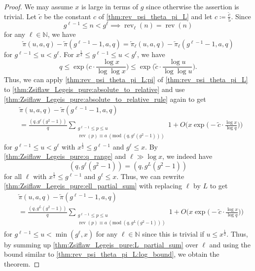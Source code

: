 \documentclass[hidelinks]{amsart}
\numberwithin{equation}{section}
\theoremstyle{plain}
\theoremstyle{definition}
\renewcommand{\mod}[1]{(\mathrm{mod}\ #1)}
\DeclareMathOperator{\rev}{rev}
\begin{document}
\begin{proof}
We may assume $x$ is large in terms of $g$ since otherwise the assertion is trivial.
Let $\widetilde{c}$ be the constant $c$ of \cref{thm:rev_psi_theta_pi_L}
and let $c\coloneqq\frac{\widetilde{c}}{5}$.
Since
\begin{equation}
\label{thm:Zsiflaw_Legeis_pure:absolute_to_relative_rule}
g^{\ell-1}\le n<g^{\ell}
\implies
\rev_{\ell}(n)=\rev(n)
\end{equation}
for any $\ell\in\mathbb{N}$, we have
\begin{equation}
\label{thm:Zsiflaw_Legeis_pure:absolute_to_relative}
\overleftarrow{\pi}(u,a,q)-\overleftarrow{\pi}(g^{\ell-1}-1,a,q)
=
\overleftarrow{\pi}\!_{\ell}(u,a,q)-\overleftarrow{\pi}\!_{\ell}(g^{\ell-1}-1,a,q)
\end{equation}
for $g^{\ell-1}\le u<g^{\ell}$.
For $x^{\frac{1}{2}}\le g^{\ell-1}\le u<g^{\ell}$, we have
\[
q
\le
\exp\biggl(c\cdot\frac{\log x}{\log\log x}\biggr)
\le
\exp\biggl(\widetilde{c}\cdot\frac{\log u}{\log\log u}\biggr).
\]
Thus, we can apply \cref{thm:rev_psi_theta_pi_L:pi} of \cref{thm:rev_psi_theta_pi_L}
to \cref{thm:Zsiflaw_Legeis_pure:absolute_to_relative}
and use \cref{thm:Zsiflaw_Legeis_pure:absolute_to_relative_rule} again to get
\begin{equation}
\label{thm:Zsiflaw_Legeis_pure:ell_partial_sum}
\begin{aligned}
&\overleftarrow{\pi}(u,a,q)-\overleftarrow{\pi}(g^{\ell-1}-1,a,q)\\
&=
\frac{(q,g^{\ell}(g^{2}-1))}{q}
\sum_{\substack{
g^{\ell-1}\le p\le u\\
\rev(p)\equiv a\ \mod{(q,g^{\ell}(g^{2}-1))}
}}
1
+
O\biggl(x\exp\biggl(-\widetilde{c}\cdot\frac{\log x}{\log q}\biggr)\biggr)
\end{aligned}
\end{equation}
for $g^{\ell-1}\le u<g^{\ell}$ with $x^{\frac{1}{2}}\le g^{\ell-1}$ and $g^{\ell}\le x$.
By \cref{thm:Zsiflaw_Legeis_pure:q_range} and $\ell\gg\log x$, we indeed have
\[
(q,g^{\ell}(g^{2}-1))
=
(q,g^{L}(g^{2}-1))
\]
for all $\ell$ with $x^{\frac{1}{2}}\le g^{\ell-1}$ and $g^{\ell}\le x$.
Thus, we can rewrite \cref{thm:Zsiflaw_Legeis_pure:ell_partial_sum}
with replacing $\ell$ by $L$ to get
\begin{equation}
\label{thm:Zsiflaw_Legeis_pure:L_partial_sum}
\begin{aligned}
&\overleftarrow{\pi}(u,a,q)-\overleftarrow{\pi}(g^{\ell-1}-1,a,q)\\
&=
\frac{(q,g^{L}(g^{2}-1))}{q}
\sum_{\substack{
g^{\ell-1}\le p\le u\\
\rev(p)\equiv a\ \mod{(q,g^{L}(g^{2}-1))}
}}
1
+
O\biggl(x\exp\biggl(-\widetilde{c}\cdot\frac{\log x}{\log q}\biggr)\biggr)
\end{aligned}
\end{equation}
for $g^{\ell-1}\le u<\min(g^{\ell},x)$ for any $\ell\in\mathbb{N}$
since this is trivial if $u\le x^{\frac{1}{2}}$.
Thus, by summing up \cref{thm:Zsiflaw_Legeis_pure:L_partial_sum}
over $\ell$ and using the bound similar to \cref{thm:rev_psi_theta_pi_L:log_bound},
we obtain the theorem.
\end{proof}
\end{document}
